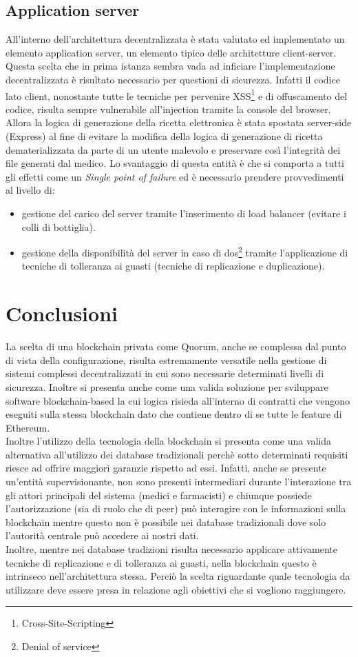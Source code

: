 \subsection{Application server}
All'interno dell'architettura decentralizzata è stata valutato ed implementato un elemento application server, un elemento tipico delle architetture client-server. Questa scelta che in prima istanza sembra vada ad inficiare l'implementazione decentralizzata è risultato necessario per questioni di sicurezza. Infatti il codice lato client, nonostante tutte le tecniche per pervenire XSS\footnote{Cross-Site-Scripting} e di offuscamento del codice, risulta sempre vulnerabile all'injection tramite la console del browser. Allora la logica di generazione della ricetta elettronica è stata spostata server-side (Express) al fine di evitare la modifica della logica di generazione di ricetta dematerializzata da parte di un utente malevolo e preservare così l'integrità dei file generati dal medico. Lo svantaggio di questa entità è che si comporta a tutti gli effetti come un \emph{Single point of failure} ed è necessario prendere provvedimenti al livello di:
\begin{itemize}
	\item gestione del carico del server tramite l'inserimento di load balancer (evitare i colli di bottiglia).
	\item gestione della disponibilità del server in caso di \gls{dos}\footnote{Denial of service} tramite l'applicazione di tecniche di tolleranza ai guasti (tecniche di replicazione e duplicazione).
\end{itemize}
%
\section{Conclusioni}
%
La scelta di una blockchain privata come Quorum, anche se complessa dal punto di vista della configurazione, risulta estremamente versatile nella gestione di sistemi complessi decentralizzati in cui sono necessarie determinati livelli di sicurezza. Inoltre si presenta anche come una valida soluzione per sviluppare software blockchain-based la cui logica risieda all'interno di contratti che vengono eseguiti sulla stessa blockchain dato che contiene dentro di se tutte le feature di Ethereum. \\
Inoltre l'utilizzo della tecnologia della blockchain si presenta come una valida alternativa all'utilizzo dei database tradizionali perchè sotto determinati requisiti riesce ad offrire maggiori garanzie rispetto ad essi. Infatti, anche se presente un'entità supervisionante, non sono presenti intermediari durante l'interazione tra gli attori principali del sistema (medici e farmacisti) e chiunque possiede l'autorizzazione (sia di ruolo che di peer) può interagire con le informazioni sulla blockchain mentre questo non è possibile nei database tradizionali dove solo l'autorità centrale può accedere ai nostri dati. \\
Inoltre, mentre nei database tradizioni risulta necessario applicare attivamente tecniche di replicazione e di tolleranza ai guasti, nella blockchain questo è intrinseco nell'architettura stessa. Perciò la scelta riguardante quale tecnologia da utilizzare deve essere presa in relazione agli obiettivi che si vogliono raggiungere.
